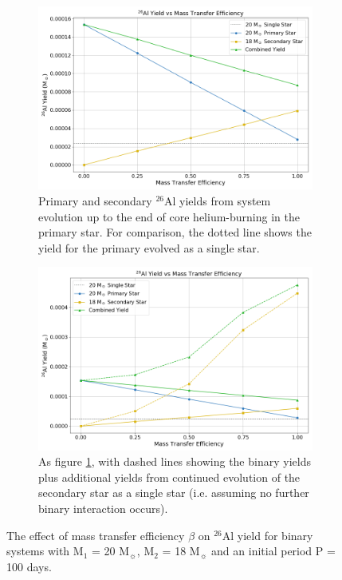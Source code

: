 \begin{figure}
    \centering
    \begin{subfigure}{\columnwidth}
        \includegraphics[width=\columnwidth]{figures/results2/fig_YieldvsMTE.png}
        \caption{Primary and secondary $^{26}$Al yields from system evolution up to the end of core helium-burning in the primary star. For comparison, the dotted line shows the yield for the primary evolved as a single star.}
        \label{subfig:MTE1}
    \end{subfigure}
    \begin{subfigure}{\columnwidth}
        \includegraphics[width=\columnwidth]{figures/results2/fig_YieldvsMTE_2.png}
        \caption{As figure \ref{subfig:MTE1}, with dashed lines showing the binary yields plus additional yields from continued evolution of the secondary star as a single star (i.e. assuming no further binary interaction occurs).}
        \label{subfig:MTE2}
    \end{subfigure}
    \captionsetup{width=\columnwidth}
    \caption{The effect of mass transfer efficiency $\beta$ on $^{26}$Al yield for binary systems with M$_1$ = 20 M$_{\sun}$, M$_2$ = 18 M$_{\sun}$ and an initial period P = 100 days.}
    \label{fig:MTE}
\end{figure}

